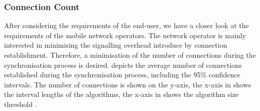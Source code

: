 \subsubsection*{Connection Count}\label{sec:application:cloud_file_synchronisation:numerical_evaluation:connection_count}

After considering the requirements of the end-user, we have a closer look at the requirements of the mobile network operators.
The network operator is mainly interested in minimising the signalling overhead introduce by connection establishment.
Therefore, a minimisation of the number of connections \connectionCount during the synchronisation process is desired.
 depicts the average number of connections \connectionCount established during the synchronisation process, including the 95\% confidence intervals.
The number of connections is shown on the y-axis, the x-axis in  shows the interval lengths \thresholdInterval of the \algointerval algorithms, the x-axis in  shows the \algosize algorithm size threshold \thresholdSize.

